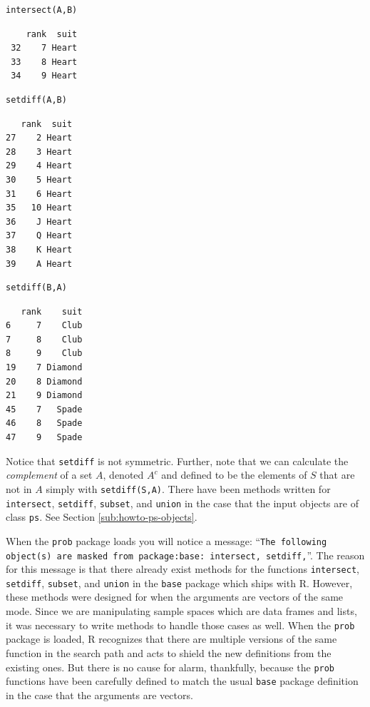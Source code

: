 \documentclass[captions=tableheading]{scrbook}
\begin{document}
\begin{verbatim}
intersect(A,B)
\end{verbatim}

\begin{verbatim}
    rank  suit
 32    7 Heart
 33    8 Heart
 34    9 Heart
\end{verbatim}


\begin{verbatim}
setdiff(A,B)
\end{verbatim}


\begin{verbatim}
   rank  suit
27    2 Heart
28    3 Heart
29    4 Heart
30    5 Heart
31    6 Heart
35   10 Heart
36    J Heart
37    Q Heart
38    K Heart
39    A Heart
\end{verbatim}


\begin{verbatim}
setdiff(B,A)
\end{verbatim}


\begin{verbatim}
   rank    suit
6     7    Club
7     8    Club
8     9    Club
19    7 Diamond
20    8 Diamond
21    9 Diamond
45    7   Spade
46    8   Spade
47    9   Spade
\end{verbatim}

Notice that \texttt{setdiff} is not symmetric. Further, note that we can calculate the \emph{complement} of a set \(A\), denoted \(A^{c}\) and defined to be the elements of \(S\) that are not in \(A\) simply with \texttt{setdiff(S,A)}. There have been methods written for \texttt{intersect}, \texttt{setdiff}, \texttt{subset}, and \texttt{union} in the case that the input objects are of class \texttt{ps}. See Section \ref{sub:howto-ps-objects}.

\begin{note}

When the \texttt{prob} package loads you will notice a message: ``\texttt{The following object(s) are masked from package:base: intersect, setdiff,}''. The reason for this message is that there already exist methods for the functions \texttt{intersect}, \texttt{setdiff}, \texttt{subset}, and \texttt{union} in the \texttt{base} package which ships with \textsf{R}. However, these methods were designed for when the arguments are vectors of the same mode. Since we are manipulating sample spaces which are data frames and lists, it was necessary to write methods to handle those cases as well. When the \texttt{prob} package is loaded, \textsf{R} recognizes that there are multiple versions of the same function in the search path and acts to shield the new definitions from the existing ones. But there is no cause for alarm, thankfully, because the \texttt{prob} functions have been carefully defined to match the usual \texttt{base} package definition in the case that the arguments are vectors. 

\end{note}
\end{document}
